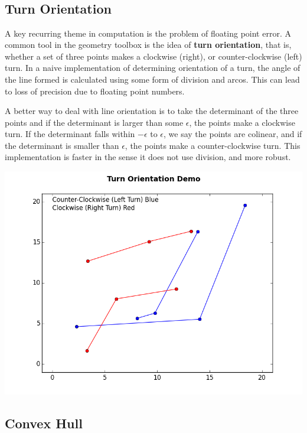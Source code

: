 \documentclass[12pt]{article}
\title{\textmd{\bf \Class\\}}
\author{\small \normalfont{Advisor: Chandrajit Bajaj}\\
\small \normalfont{\StudentName}}
\date{}
\begin{document}
\maketitle \thispagestyle{empty}

\subsection{Turn Orientation}

\quad\qquad A key recurring theme in computation is the problem of floating point error. A common tool in the geometry toolbox is the idea of \textbf{turn orientation}, that is, whether a set of three points makes a clockwise (right), or counter-clockwise (left) turn. In a naive implementation of determining orientation of a turn, the angle of the line formed is calculated using some form of division and arcos. This can lead to loss of precision due to floating point numbers.

\quad A better way to deal with line orientation is to take the determinant of the three points and if the determinant is larger than some $\epsilon$, the points make a clockwise turn. If the determinant falls within $-\epsilon$ to $\epsilon$, we say the points are colinear, and if the determinant is smaller than $\epsilon$, the points make a counter-clockwise turn. This implementation is faster in the sense it does not use division, and more robust. \newline 
\\
\centerline{\includegraphics[scale=0.7]{turn_orientation.png}}

\subsection{Convex Hull}
\end{document}
